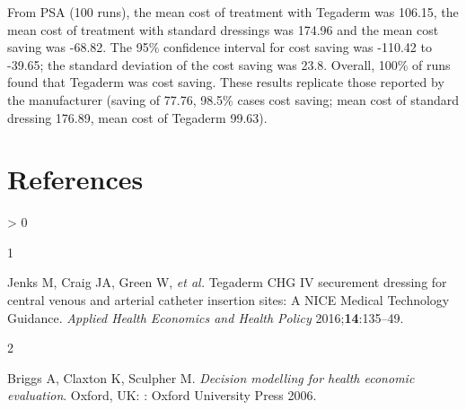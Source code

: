 \documentclass[
]{article}
\newlength{\cslhangindent}
\newlength{\csllabelwidth}
\newenvironment{CSLReferences}[2] %
 {%
  \setlength{\parindent}{0pt}
  \ifodd #1 \everypar{\setlength{\hangindent}{\cslhangindent}}\ignorespaces\fi
  \ifnum #2 > 0
  \setlength{\parskip}{#2\baselineskip}
  \fi
 }%
 {}
\newcommand{\CSLLeftMargin}[1]{\parbox[t]{\csllabelwidth}{#1}}
\newcommand{\CSLRightInline}[1]{\parbox[t]{\linewidth - \csllabelwidth}{#1}\break}
\begin{document}
From PSA (100 runs), the mean cost of treatment with Tegaderm was
106.15, the mean cost of treatment with standard dressings was 174.96
and the mean cost saving was -68.82. The 95\% confidence interval for
cost saving was -110.42 to -39.65; the standard deviation of the cost
saving was 23.8. Overall, 100\% of runs found that Tegaderm was cost
saving. These results replicate those reported by the manufacturer
(saving of 77.76, 98.5\% cases cost saving; mean cost of standard
dressing 176.89, mean cost of Tegaderm 99.63).

\hypertarget{references}{%
\section*{References}\label{references}}

\hypertarget{refs}{}
\begin{CSLReferences}{0}{0}
\leavevmode\hypertarget{ref-jenks:2016a}{}%
\CSLLeftMargin{1 }
\CSLRightInline{Jenks M, Craig JA, Green W, \emph{et al.} {Tegaderm CHG
IV} securement dressing for central venous and arterial catheter
insertion sites: A {NICE Medical Technology Guidance}. \emph{Applied
Health Economics and Health Policy} 2016;\textbf{14}:135--49.}

\leavevmode\hypertarget{ref-briggs:2002a}{}%
\CSLLeftMargin{2 }
\CSLRightInline{Briggs A, Claxton K, Sculpher M. \emph{Decision
modelling for health economic evaluation}. Oxford, UK: : Oxford
University Press 2006. }

\end{CSLReferences}
\end{document}

